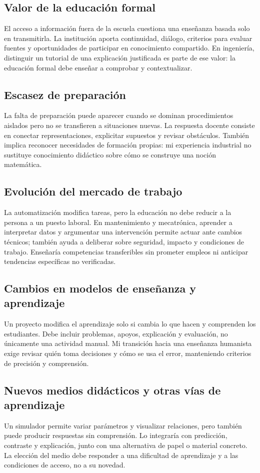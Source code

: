 \documentclass[spanish,letterpaper,oneside]{article}
\begin{document}
\subsection{Valor de la educación formal}
El acceso a información fuera de la escuela cuestiona una enseñanza basada solo en transmitirla. La institución aporta continuidad, diálogo, criterios para evaluar fuentes y oportunidades de participar en conocimiento compartido. En ingeniería, distinguir un tutorial de una explicación justificada es parte de ese valor: la educación formal debe enseñar a comprobar y contextualizar.
\subsection{Escasez de preparación}
La falta de preparación puede aparecer cuando se dominan procedimientos aislados pero no se transfieren a situaciones nuevas. La respuesta docente consiste en conectar representaciones, explicitar supuestos y revisar obstáculos. También implica reconocer necesidades de formación propias: mi experiencia industrial no sustituye conocimiento didáctico sobre cómo se construye una noción matemática.
\subsection{Evolución del mercado de trabajo}
La automatización modifica tareas, pero la educación no debe reducir a la persona a un puesto laboral. En mantenimiento y mecatrónica, aprender a interpretar datos y argumentar una intervención permite actuar ante cambios técnicos; también ayuda a deliberar sobre seguridad, impacto y condiciones de trabajo. Enseñaría competencias transferibles sin prometer empleos ni anticipar tendencias específicas no verificadas.
\subsection{Cambios en modelos de enseñanza y aprendizaje}
Un proyecto modifica el aprendizaje solo si cambia lo que hacen y comprenden los estudiantes. Debe incluir problemas, apoyos, explicación y evaluación, no únicamente una actividad manual. Mi transición hacia una enseñanza humanista exige revisar quién toma decisiones y cómo se usa el error, manteniendo criterios de precisión y comprensión.
\subsection{Nuevos medios didácticos y otras vías de aprendizaje}
Un simulador permite variar parámetros y visualizar relaciones, pero también puede producir respuestas sin comprensión. Lo integraría con predicción, contraste y explicación, junto con una alternativa de papel o material concreto. La elección del medio debe responder a una dificultad de aprendizaje y a las condiciones de acceso, no a su novedad.
\end{document}
